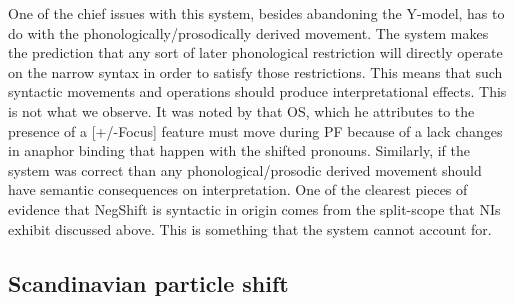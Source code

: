 \documentclass[12pt, letterpaper]{article}
\begin{document}
One of the chief issues with this system, besides abandoning the Y-model, has to do with the phonologically/prosodically derived movement. The \citeauthor{zubizarretaProsodyFocusWord1998} system makes the prediction that any sort of later phonological restriction will directly operate on the narrow syntax in order to satisfy those restrictions. This means that such syntactic movements and operations should produce interpretational effects. This is not what we observe. It was noted by \citep{holmbergRemarksHolmbergGeneralization1999} that OS, which he attributes to the presence of a [+/-Focus] feature must move during PF because of a lack changes in anaphor binding that happen with the shifted pronouns. Similarly, if the \citeauthor{zubizarretaProsodyFocusWord1998} system was correct than any phonological/prosodic derived movement should have semantic consequences on interpretation. One of the clearest pieces of evidence that NegShift is syntactic in origin comes from the split-scope that NIs exhibit \citep{iatridouNegativeDPsAMovement2011,zeijlstraSyntacticallyComplexStatus2011} discussed above. This is something that the \citeauthor{zubizarretaProsodyFocusWord1998} system cannot account for. 

\subsection{Scandinavian particle shift} \label{sec:Particles}
\end{document}
